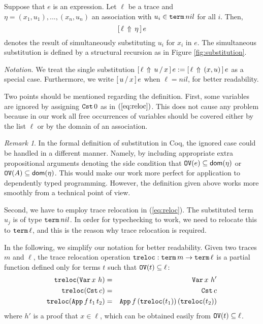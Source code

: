 \documentclass{kms-j}
\theoremstyle{plain}
\theoremstyle{remark}
\newtheorem{rem}[thm]{Remark}
\begin{document}
Suppose that $e$ is an expression.
Let $\ell$ be a trace and $\eta = (x_1, u_1), ..., (x_n,u_n)$ an association with
$u_i\in \tterm\, nil$ for all $i$.
Then,
\[
\substa{e}{\eta}{\ell}
\]
denotes the result of simultaneously substituting $u_i$ for $x_i$ in $e$.
The simultaneous substitution is defined by a structural recursion
as in Figure \ref{fig:substitution}.
\medskip

\noindent\textit{Notation.}
We treat the single substitution $\subst{e}{x}{u}{\ell} := \substa{e}{(x,u)}{\ell}$ as a special case.
Furthermore, we write $\substs{e}{x}{u}$ when $\ell = nil$, for better readability.
\medskip

Two points should be mentioned regarding the definition.
First, some variables are ignored by assigning $\tCst\, 0$ as in $(\ref{eq:reloc})$.
This does not cause any problem because in our work all free occurrences of variables
should be covered either by the list $\ell$ or by the domain of an association.

\begin{rem}
In the formal definition of substitution in Coq,
the ignored case could be handled in a different manner.
Namely, by including appropriate extra propositional
arguments denoting the side condition that
$\tPH(e) \subseteq \dom(\eta)$ or $\tPH(A) \subseteq \dom(\eta)$. This
would make our work more perfect for application to dependently typed programming.
However, the definition given above works more smoothly
from a technical point of view.
\end{rem}

Second, we have to employ trace relocation in (\ref{eq:reloc}).
The substituted term $u_{j}$ is of type $\tpterm\, nil$.
In order for typechecking to work, we need to relocate this to $\tpterm\, \ell$,
and this is the reason why trace relocation is required.

In the following, we simplify our notation for better readability.
Given two traces $m$ and $\ell$, the trace relocation operation
$\ttlift: \tpterm\, m \to \tpterm \, \ell$ is a partial function
defined only for terms $t$ such that $\tPH(t) \subseteq \ell$:
\begin{eqnarray}
    \ttlift(\tBvar\, x\,\, h) & = & \tBvar\, x\,\, h' \nonumber\\
    \ttlift(\tCst\, c) & = & \tCst\, c \nonumber \\
    \ttlift (\tApp\, f\, t_1\, t_2) & = & \tApp\, f\,(\ttlift (t_1))\, (\ttlift(t_2)) \nonumber
  \end{eqnarray}
where  $h'$ is a proof that $x \in \ell$, which can be obtained easily from $\tPH(t) \tm \ell$.
\end{document}

